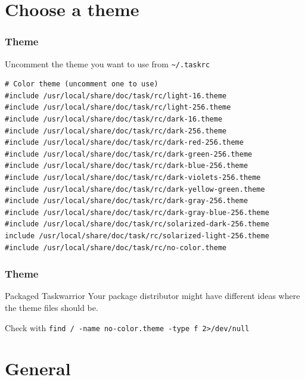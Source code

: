 \documentclass[t,handout]{beamer}
\begin{document}
\section{Choose a theme}

\begin{frame}[fragile]\frametitle{Theme}
    \vfill
    Uncomment the theme you want to use from \verb+~/.taskrc+
    \begin{lstlisting}
# Color theme (uncomment one to use)
#include /usr/local/share/doc/task/rc/light-16.theme
#include /usr/local/share/doc/task/rc/light-256.theme
#include /usr/local/share/doc/task/rc/dark-16.theme
#include /usr/local/share/doc/task/rc/dark-256.theme
#include /usr/local/share/doc/task/rc/dark-red-256.theme
#include /usr/local/share/doc/task/rc/dark-green-256.theme
#include /usr/local/share/doc/task/rc/dark-blue-256.theme
#include /usr/local/share/doc/task/rc/dark-violets-256.theme
#include /usr/local/share/doc/task/rc/dark-yellow-green.theme
#include /usr/local/share/doc/task/rc/dark-gray-256.theme
#include /usr/local/share/doc/task/rc/dark-gray-blue-256.theme
#include /usr/local/share/doc/task/rc/solarized-dark-256.theme
include /usr/local/share/doc/task/rc/solarized-light-256.theme
#include /usr/local/share/doc/task/rc/no-color.theme\end{lstlisting}
\end{frame}

\begin{frame}[fragile]\frametitle{Theme}
    \vfill
    \begin{alertblock}{Packaged Taskwarrior}
        Your package distributor might have different ideas where the theme files should be.

        Check with \verb+find / -name no-color.theme -type f 2>/dev/null+
    \end{alertblock}
\end{frame}

\section{General}
\end{document}

